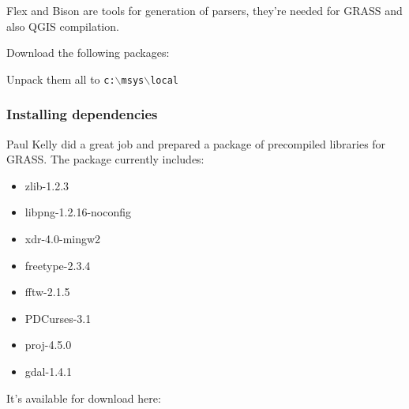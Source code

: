 Flex and Bison are tools for generation of parsers, they're needed for GRASS and also QGIS compilation.

Download the following packages:

	\begin{quotation}
	\end{quotation}

	\begin{quotation}
	\end{quotation}

	\begin{quotation}
	\end{quotation}

Unpack them all to \texttt{c:$\backslash$msys$\backslash$local}

\subsubsection{Installing dependencies}
Paul Kelly did a great job and prepared a package of precompiled libraries for GRASS.
The package currently includes:

\begin{itemize}
\item zlib-1.2.3
\item libpng-1.2.16-noconfig
\item xdr-4.0-mingw2
\item freetype-2.3.4
\item fftw-2.1.5
\item PDCurses-3.1
\item proj-4.5.0
\item gdal-1.4.1
\end{itemize}

It's available for download here:

	\begin{quotation}
	\end{quotation}

